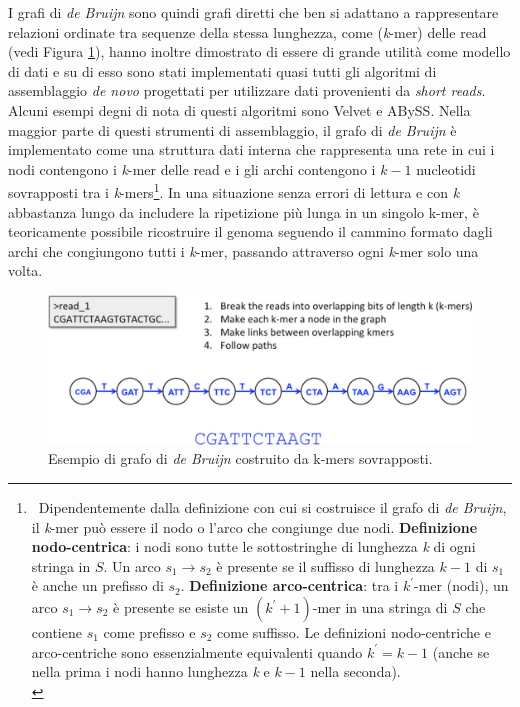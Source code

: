 \documentclass[../main.tex]{subfiles}
\begin{document}
\noindent
I grafi di \textit{de Bruijn} sono quindi grafi diretti che ben si adattano a rappresentare relazioni ordinate tra sequenze della stessa lunghezza, come (\textit{k}-mer) delle read (vedi Figura \ref{fig:dBG}), hanno inoltre dimostrato di essere di grande utilit\`a come modello di dati e su di esso sono stati implementati quasi tutti gli algoritmi di assemblaggio \textit{de novo} progettati per utilizzare dati provenienti da \textit{short reads}. Alcuni esempi degni di nota di questi algoritmi sono Velvet e ABySS. Nella maggior parte di questi strumenti di assemblaggio, il grafo di \textit{de Bruijn} \`e implementato come una struttura dati interna che rappresenta una rete in cui i nodi contengono i \textit{k}-mer delle read e i gli archi contengono i $k-1$ nucleotidi sovrapposti tra i \textit{k}-mers\footnote{\ Dipendentemente dalla definizione con cui si costruisce il grafo di \textit{de Bruijn}, il \textit{k}-mer pu\`o essere il nodo o l'arco che congiunge due nodi. \textbf{Definizione nodo-centrica}: i nodi sono tutte le sottostringhe di lunghezza \textit{k} di ogni stringa in $S$. Un arco $s_1 \rightarrow s_2$ è presente se il suffisso di lunghezza $k-1$ di $s_1$ è anche un prefisso di $s_2$. \textbf{Definizione arco-centrica}: tra i $k^\prime$-mer (nodi), un arco $s_1 \rightarrow s_2$ è presente se esiste un $(k^\prime+1)$-mer in una stringa di $S$ che contiene $s_1$ come prefisso e $s_2$ come suffisso. Le definizioni nodo-centriche e arco-centriche sono essenzialmente equivalenti quando $k^\prime = k-1$ (anche se nella prima i nodi hanno lunghezza \textit{k} e $k - 1$ nella seconda).\\}. In una situazione senza errori di lettura e con \textit{k} abbastanza lungo da includere la ripetizione più lunga in un singolo k-mer, \`e teoricamente possibile ricostruire il genoma seguendo il cammino formato dagli archi che congiungono tutti i \textit{k}-mer, passando attraverso ogni \textit{k}-mer solo una volta. 

\begin{figure}[h!]
	\centering
  	\captionsetup{justification=centering}
  	\includegraphics[scale=.3]{images/dBG.png}
  	\caption{Esempio di grafo di \textit{de Bruijn} costruito da k-mers sovrapposti.}
  	\label{fig:dBG}
\end{figure}
\end{document}
